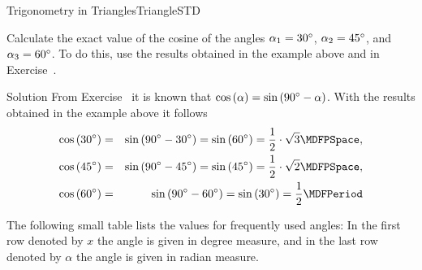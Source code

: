 \begin{MXContent}{Trigonometry in Triangles}{Triangle}{STD}
\begin{MExercise}
Calculate the exact value of the cosine of the angles $\alpha_1=30^{\circ}$, 
$\alpha_2=45^{\circ}$, and $\alpha_3=60^{\circ}$. To do this, use the results obtained 
in the example above and in Exercise~.

\begin{MHint}{Solution}
From Exercise~ it is known  
that $\cos\left(\alpha\right)= \sin\left(90^{\circ}-\alpha\right)$.
With the results obtained in the example above it follows
\begin{eqnarray*}
\cos\left(30\MGrad\right) %
 & = & \sin\left(90\MGrad-30\MGrad\right) %
 =\sin\left(60\MGrad\right) %
 =\frac{1}{2}\cdot\sqrt{3} \MDFPSpace, \\
%
\cos\left(45\MGrad\right)
 & = & \sin\left(90\MGrad-45\MGrad\right) %
 =\sin\left(45\MGrad\right) %
 =\frac{1}{2}\cdot\sqrt{2} \MDFPSpace, \\
%
\cos\left(60\MGrad\right) %
 & = & \sin\left(90\MGrad-60\MGrad\right) %
 =\sin\left(30\MGrad\right) %
 =\frac{1}{2} \MDFPeriod \\
\end{eqnarray*}
\end{MHint}
\end{MExercise}

The following small table lists the values for frequently used angles:
In the first row denoted by $x$ the angle is given in degree measure, and 
in the last row denoted by $\alpha$ the angle is given in radian measure.


\end{MXContent}
